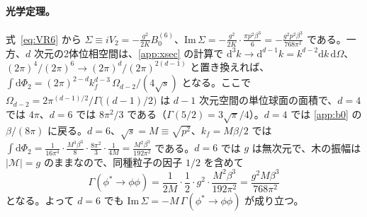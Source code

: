 \documentclass[a4paper,10pt]{ltjsarticle}
\newcommand{\dd}{\mathrm{d}}
\begin{document}
\paragraph{光学定理。}式~\eqref{eq:VR6} から $\Sigma\equiv iV_2=-\frac{g^2}{2K}B_0^{(6)}$、$\mathrm{Im}\,\Sigma=-\frac{g^2}{2K}\cdot\frac{\pi p^2\beta^3}{6}=-\frac{g^2p^2\beta^3}{768\pi^2}$ である。一方、$d$ 次元の2体位相空間は、\ref{app:xsec} の計算で $\dd^3k\to\dd^{d-1}k=k^{d-2}\dd k\,\dd\Omega$、$(2\pi)^4/(2\pi)^6\to(2\pi)^d/(2\pi)^{2(d-1)}$ と置き換えれば、$\int\dd\Phi_2=(2\pi)^{2-d}k_f^{d-3}\,\Omega_{d-2}/(4\sqrt s)$ となる。ここで $\Omega_{d-2}=2\pi^{(d-1)/2}/\Gamma\bigl((d-1)/2\bigr)$ は $d-1$ 次元空間の単位球面の面積で、$d=4$ では $4\pi$、$d=6$ では $8\pi^2/3$ である（$\Gamma(5/2)=3\sqrt\pi/4$）。$d=4$ では \ref{app:b0} の $\beta/(8\pi)$ に戻る。$d=6$、$\sqrt s=M\equiv\sqrt{p^2}$、$k_f=M\beta/2$ では $\int\dd\Phi_2=\frac{1}{16\pi^4}\cdot\frac{M^3\beta^3}{8}\cdot\frac{8\pi^2}{3}\cdot\frac{1}{4M}=\frac{M^2\beta^3}{192\pi^2}$ である。$d=6$ では $g$ は無次元で、木の振幅は $|\mathcal{M}|=g$ のままなので、同種粒子の因子 $1/2$ を含めて
\begin{equation*}
\Gamma(\phi^*\to\phi\phi)=\frac{1}{2M}\cdot\frac12\cdot g^2\cdot\frac{M^2\beta^3}{192\pi^2}=\frac{g^2M\beta^3}{768\pi^2}
\end{equation*}
となる。よって $d=6$ でも $\mathrm{Im}\,\Sigma=-M\,\Gamma(\phi^*\to\phi\phi)$ が成り立つ。
\end{document}
